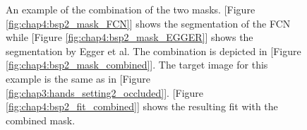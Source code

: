 \begin{figure}
\centering
{}
\caption{An example of the combination of the two masks. [Figure \ref{fig:chap4:bsp2_mask_FCN}] shows the segmentation of the FCN while [Figure \ref{fig:chap4:bsp2_mask_EGGER}] shows the segmentation by Egger et al. The combination is depicted in [Figure \ref{fig:chap4:bsp2_mask_combined}]. The target image for this example is the same as in [Figure \ref{fig:chap3:hands_setting2_occluded}]. [Figure \ref{fig:chap4:bsp2_fit_combined}] shows the resulting fit with the combined mask.}
\label{fig:chap4:bsp2}
\end{figure}



